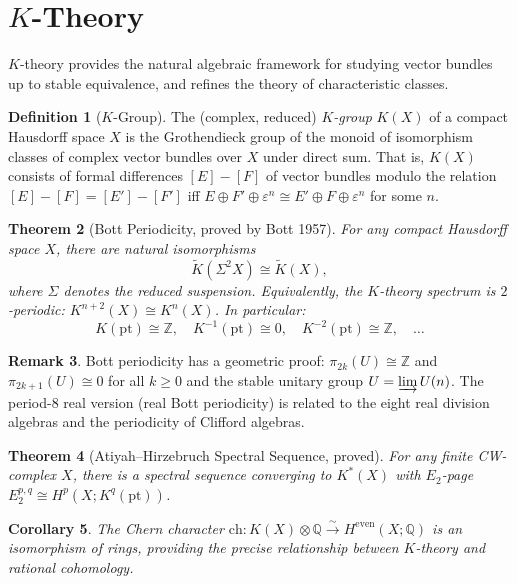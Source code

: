 \documentclass[12pt,a4paper]{amsart}
\newtheorem{theorem}{Theorem}[section]
\newtheorem{corollary}[theorem]{Corollary}
\theoremstyle{definition}
\newtheorem{definition}[theorem]{Definition}
\newtheorem{remark}[theorem]{Remark}
\begin{document}
\section{$K$-Theory}
\label{sec:ktheory}

$K$-theory provides the natural algebraic framework for studying vector bundles
up to stable equivalence, and refines the theory of characteristic classes.

\begin{definition}[$K$-Group]
The (complex, reduced) \emph{$K$-group} $K(X)$ of a compact Hausdorff space $X$
is the Grothendieck group of the monoid of isomorphism classes of complex
vector bundles over $X$ under direct sum. That is, $K(X)$ consists of formal
differences $[E] - [F]$ of vector bundles modulo the relation
$[E] - [F] = [E'] - [F']$ iff $E \oplus F' \oplus \varepsilon^n \cong E' \oplus F \oplus \varepsilon^n$
for some $n$.
\end{definition}

\begin{theorem}[Bott Periodicity, proved by Bott 1957]
\label{thm:bott}
For any compact Hausdorff space $X$, there are natural isomorphisms
\[
  \tilde{K}(\Sigma^2 X) \cong \tilde{K}(X),
\]
where $\Sigma$ denotes the reduced suspension. Equivalently, the $K$-theory
spectrum is $2$-periodic: $K^{n+2}(X) \cong K^n(X)$. In particular:
\[
  K(\mathrm{pt}) \cong \mathbb{Z}, \quad K^{-1}(\mathrm{pt}) \cong 0,
  \quad K^{-2}(\mathrm{pt}) \cong \mathbb{Z}, \quad \ldots
\]
\end{theorem}

\begin{remark}
Bott periodicity has a geometric proof: $\pi_{2k}(U) \cong \mathbb{Z}$ and
$\pi_{2k+1}(U) \cong 0$ for all $k \ge 0$ and the stable unitary group $U =
\varinjlim U(n)$. The period-$8$ real version (real Bott periodicity) is
related to the eight real division algebras and the periodicity of Clifford
algebras.
\end{remark}

\begin{theorem}[Atiyah--Hirzebruch Spectral Sequence, proved]
\label{thm:ahss}
For any finite CW-complex $X$, there is a spectral sequence converging to
$K^*(X)$ with $E_2$-page $E_2^{p,q} \cong H^p(X; K^q(\mathrm{pt}))$.
\end{theorem}

\begin{corollary}
The Chern character $\mathrm{ch} \colon K(X) \otimes \mathbb{Q} \xrightarrow{\sim}
H^{\mathrm{even}}(X; \mathbb{Q})$ is an isomorphism of rings, providing the
precise relationship between $K$-theory and rational cohomology.
\end{corollary}
\end{document}
